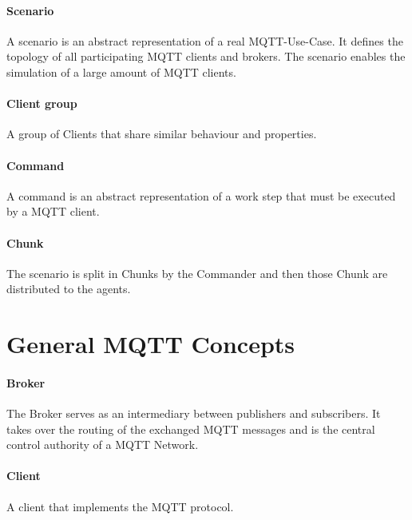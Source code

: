 \paragraph{Scenario}
A scenario is an abstract representation of a real MQTT-Use-Case.
It defines the topology of all participating MQTT clients and brokers.
The scenario enables the simulation of a large amount of MQTT clients.

\paragraph{Client group}
A group of Clients that share similar behaviour and properties.

\paragraph{Command}
A command is an abstract representation of a work step that must be executed by a MQTT client.

\paragraph{Chunk}
The scenario is split in Chunks by the Commander and then those Chunk are distributed to the agents.


\section{General MQTT Concepts}
\paragraph{Broker}
The Broker serves as an intermediary between publishers and subscribers.
It takes over the routing of the exchanged MQTT messages and is the central control authority of a MQTT Network.
\paragraph{Client}
A client that implements the MQTT protocol. 
